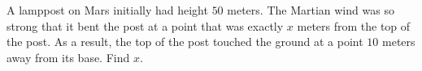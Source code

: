 A lamppost on Mars initially had height $50$ meters. The Martian wind was so strong that it bent the post at a point that was exactly $x$ meters from the top of the post. As a result, the top of the post touched the ground at a point $10$ meters away from its base. Find $x$.
